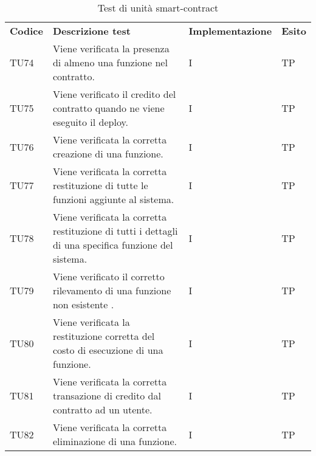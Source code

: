 \renewcommand{\arraystretch}{1.5}
\begin{longtable}{|C{1.5cm}|C{8cm}|C{3cm}|C{1cm}|}

	\caption{Test di unità smart-contract}\\
	\hline

	\textbf{Codice} & \textbf{Descrizione test}  &\textbf{Implementazione}& \textbf{Esito}
	\tabularnewline
	\endfirsthead

	TU74 &
	Viene verificata la presenza di almeno una funzione nel contratto.  &
	I & TP\\

	TU75 &
	Viene verificato il credito del contratto quando ne viene eseguito il deploy.  &
	I & TP\\

	TU76 &
	Viene verificata la corretta creazione di una funzione.  &
	I & TP\\

	TU77 &
	Viene verificata la corretta restituzione di tutte le funzioni aggiunte al sistema.  &
	I & TP\\

	TU78 &
	Viene verificata la corretta restituzione di tutti i dettagli di una specifica funzione del sistema.  &
	I & TP\\

	TU79 &
	Viene verificato il corretto rilevamento di una funzione non esistente .  &
	I & TP\\


	TU80 &
	Viene verificata la restituzione corretta del costo  di esecuzione di una funzione.  &
	I & TP\\



	TU81 &
	Viene verificata la corretta transazione di credito dal contratto ad un utente.  &
	I  & TP \\

	TU82 &
	Viene verificata la corretta eliminazione di una funzione.  &
	I & TP\\


\end{longtable}
